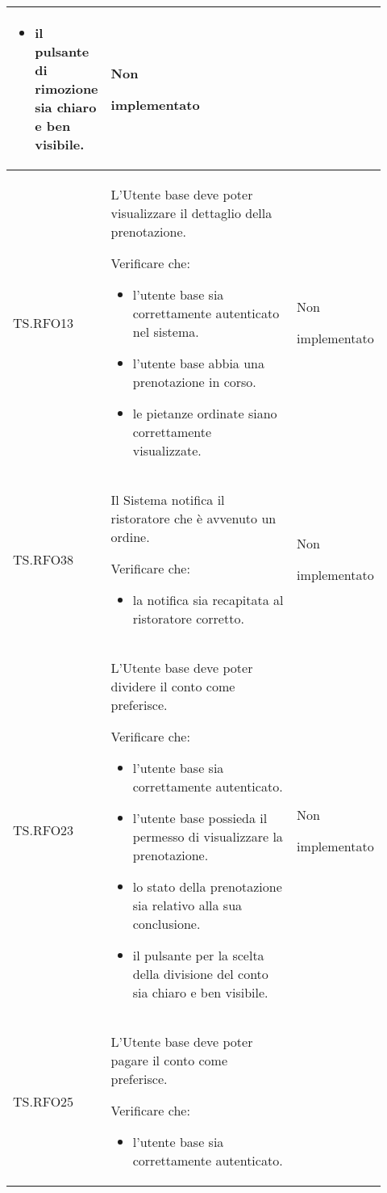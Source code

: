 \begin{longtable}{|p{0.10\linewidth}|p{0.70\linewidth}|p{0.12\linewidth}|}
\begin{itemize}
        \item il pulsante di rimozione sia chiaro e ben visibile.
    \end{itemize}&
    Non \par implementato  \\
    \hline
    TS.RFO13 & 
    L’Utente base deve poter visualizzare il dettaglio della prenotazione.   \par 
    Verificare che: 
    \begin{itemize}
        \item l'utente base sia correttamente autenticato nel sistema.
        \item l'utente base abbia una prenotazione in corso.
        \item le pietanze ordinate siano correttamente visualizzate.
    \end{itemize}&
    Non \par implementato  \\
    \hline
    TS.RFO38 & 
    Il Sistema notifica il ristoratore che è avvenuto un ordine.   \par 
    Verificare che: 
    \begin{itemize}
        \item la notifica sia recapitata al ristoratore corretto.
    \end{itemize}&
    Non \par implementato  \\
    \hline
    TS.RFO23 & 
    L’Utente base deve poter dividere il conto come preferisce.   \par 
    Verificare che: 
    \begin{itemize}
        \item l'utente base sia correttamente autenticato.
        \item l'utente base possieda il permesso di visualizzare la prenotazione.
        \item lo stato della prenotazione sia relativo alla sua conclusione.
        \item il pulsante per la scelta della divisione del conto sia chiaro e ben visibile.
    \end{itemize}&
    Non \par implementato  \\
    \hline
    TS.RFO25 & 
    L’Utente base deve poter pagare il conto come preferisce.   \par 
    Verificare che: 
    \begin{itemize}
        \item l'utente base sia correttamente autenticato.

\end{itemize}
\end{longtable}
